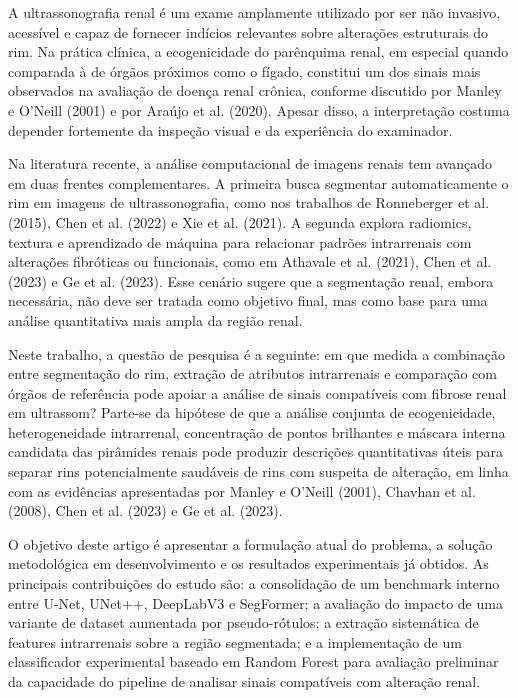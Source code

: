 \documentclass[12pt]{article}
\begin{document}
A ultrassonografia renal é um exame amplamente utilizado por ser não invasivo, acessível e capaz de fornecer indícios relevantes sobre alterações estruturais do rim. Na prática clínica, a ecogenicidade do parênquima renal, em especial quando comparada à de órgãos próximos como o fígado, constitui um dos sinais mais observados na avaliação de doença renal crônica, conforme discutido por Manley e O'Neill (2001) e por Araújo et al. (2020). Apesar disso, a interpretação costuma depender fortemente da inspeção visual e da experiência do examinador.

Na literatura recente, a análise computacional de imagens renais tem avançado em duas frentes complementares. A primeira busca segmentar automaticamente o rim em imagens de ultrassonografia, como nos trabalhos de Ronneberger et al. (2015), Chen et al. (2022) e Xie et al. (2021). A segunda explora radiomics, textura e aprendizado de máquina para relacionar padrões intrarrenais com alterações fibróticas ou funcionais, como em Athavale et al. (2021), Chen et al. (2023) e Ge et al. (2023). Esse cenário sugere que a segmentação renal, embora necessária, não deve ser tratada como objetivo final, mas como base para uma análise quantitativa mais ampla da região renal.

Neste trabalho, a questão de pesquisa é a seguinte: em que medida a combinação entre segmentação do rim, extração de atributos intrarrenais e comparação com órgãos de referência pode apoiar a análise de sinais compatíveis com fibrose renal em ultrassom? Parte-se da hipótese de que a análise conjunta de ecogenicidade, heterogeneidade intrarrenal, concentração de pontos brilhantes e máscara interna candidata das pirâmides renais pode produzir descrições quantitativas úteis para separar rins potencialmente saudáveis de rins com suspeita de alteração, em linha com as evidências apresentadas por Manley e O'Neill (2001), Chavhan et al. (2008), Chen et al. (2023) e Ge et al. (2023).

O objetivo deste artigo é apresentar a formulação atual do problema, a solução metodológica em desenvolvimento e os resultados experimentais já obtidos. As principais contribuições do estudo são: a consolidação de um benchmark interno entre U-Net, UNet++, DeepLabV3 e SegFormer; a avaliação do impacto de uma variante de dataset aumentada por pseudo-rótulos; a extração sistemática de features intrarrenais sobre a região segmentada; e a implementação de um classificador experimental baseado em Random Forest para avaliação preliminar da capacidade do pipeline de analisar sinais compatíveis com alteração renal.
\end{document}
